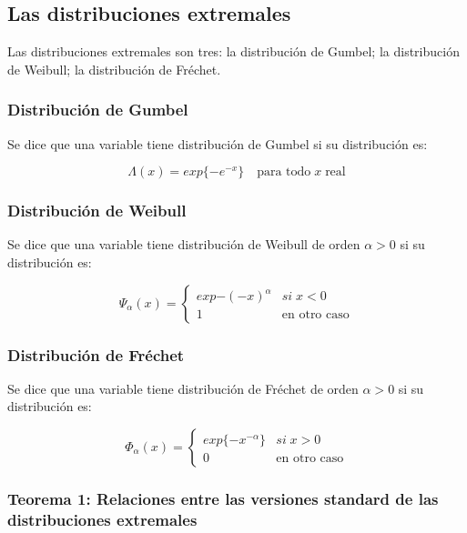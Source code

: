 \documentclass[
  12pt]{article}
\begin{document}
\hypertarget{las-distribuciones-extremales}{%
\subsection{Las distribuciones
extremales}\label{las-distribuciones-extremales}}

Las distribuciones extremales son tres: la distribución de Gumbel; la
distribución de Weibull; la distribución de Fréchet.

\hypertarget{distribuciuxf3n-de-gumbel}{%
\subsubsection{Distribución de Gumbel}\label{distribuciuxf3n-de-gumbel}}

Se dice que una variable tiene distribución de Gumbel si su distribución
es:

\[ \Lambda(x) = exp\{-e^{-x}\} \quad\text{para todo}\; x \;\text{real} \]

\hypertarget{distribuciuxf3n-de-weibull}{%
\subsubsection{Distribución de
Weibull}\label{distribuciuxf3n-de-weibull}}

Se dice que una variable tiene distribución de Weibull de orden
\(\alpha>0\) si su distribución es:

\[\Psi_{\alpha}(x)=\begin{cases}
exp{-(-x)^{\alpha}} & si\;x<0\\
1 & \text{en otro caso}
\end{cases}\]

\hypertarget{distribuciuxf3n-de-fruxe9chet}{%
\subsubsection{Distribución de
Fréchet}\label{distribuciuxf3n-de-fruxe9chet}}

Se dice que una variable tiene distribución de Fréchet de orden
\(\alpha>0\) si su distribución es:

\[
\Phi_{\alpha}(x)=\begin{cases}
exp\{-x^{-\alpha}\} & si\;x>0\\
0 & \text{en otro caso}
\end{cases}
\] \newpage

\hypertarget{teorema-1-relaciones-entre-las-versiones-standard-de-las-distribuciones-extremales}{%
\subsubsection{Teorema 1: Relaciones entre las versiones standard de las
distribuciones
extremales}\label{teorema-1-relaciones-entre-las-versiones-standard-de-las-distribuciones-extremales}}
\end{document}
